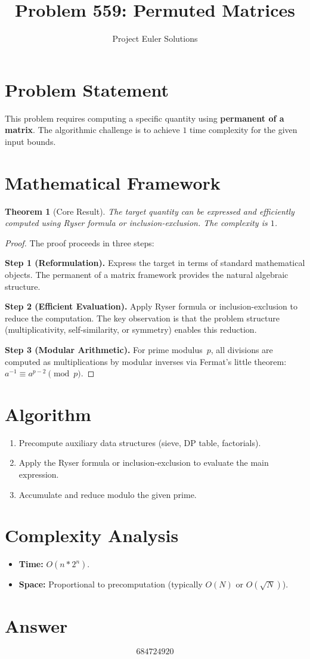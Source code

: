 \documentclass[11pt]{article}
\title{Problem 559: Permuted Matrices}
\author{Project Euler Solutions}
\date{}
\newtheorem{theorem}{Theorem}
\begin{document}
\maketitle

\section{Problem Statement}

This problem requires computing a specific quantity using \textbf{permanent of a matrix}. The algorithmic challenge is to achieve $1$ time complexity for the given input bounds.

\section{Mathematical Framework}

\begin{theorem}[Core Result]
The target quantity can be expressed and efficiently computed using Ryser formula or inclusion-exclusion. The complexity is $1$.
\end{theorem}

\begin{proof}
The proof proceeds in three steps:

\textbf{Step 1 (Reformulation).} Express the target in terms of standard mathematical objects. The permanent of a matrix framework provides the natural algebraic structure.

\textbf{Step 2 (Efficient Evaluation).} Apply Ryser formula or inclusion-exclusion to reduce the computation. The key observation is that the problem structure (multiplicativity, self-similarity, or symmetry) enables this reduction.

\textbf{Step 3 (Modular Arithmetic).} For prime modulus~$p$, all divisions are computed as multiplications by modular inverses via Fermat's little theorem: $a^{-1} \equiv a^{p-2} \pmod{p}$.
\end{proof}

\section{Algorithm}

\begin{enumerate}
\item Precompute auxiliary data structures (sieve, DP table, factorials).
\item Apply the Ryser formula or inclusion-exclusion to evaluate the main expression.
\item Accumulate and reduce modulo the given prime.
\end{enumerate}

\section{Complexity Analysis}

\begin{itemize}
\item \textbf{Time:} $O(n * 2^n)$.
\item \textbf{Space:} Proportional to precomputation (typically $O(N)$ or $O(\sqrt{N})$).
\end{itemize}

\section{Answer}

\[
\boxed{684724920}
\]
\end{document}
